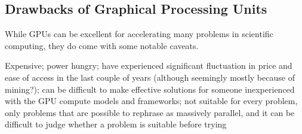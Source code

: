 \subsection{Drawbacks of Graphical Processing Units}

While GPUs can be excellent for accelerating many problems in scientific computing, they do come with some notable caveats.

Expensive; power hungry; have experienced significant fluctuation in price and ease of access in the last couple of years (although seemingly mostly because of mining?); can be difficult to make effective solutions for someone inexperienced with the GPU compute models and frameworks; not suitable for every problem, only problems that are possible to rephrase as massively parallel, and it can be difficult to judge whether a problem is suitable before trying
